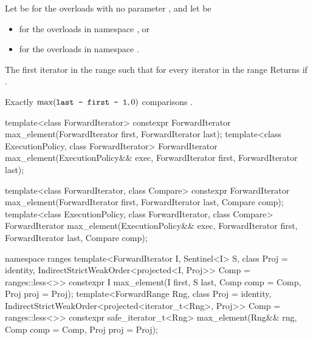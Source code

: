 \begin{itemdescr}
\begin{addedblock}
\pnum
Let  be  for the overloads with no parameter
, and let  be
\begin{itemize}
\item {} for the overloads in namespace , or
\item {} for
  the overloads in namespace .
\end{itemize}
\end{addedblock}

\pnum
\returns
The first iterator
in the range
such that for every iterator
in the range
Returns
if
.

\pnum
\complexity
Exactly
$\max(\texttt{last - first - 1}, 0)$
 comparisons
.
\end{itemdescr}


%
\begin{itemdecl}
template<class ForwardIterator>
  constexpr ForwardIterator max_element(ForwardIterator first, ForwardIterator last);
template<class ExecutionPolicy, class ForwardIterator>
  ForwardIterator max_element(ExecutionPolicy&& exec,
                              ForwardIterator first, ForwardIterator last);

template<class ForwardIterator, class Compare>
  constexpr ForwardIterator max_element(ForwardIterator first, ForwardIterator last,
                                        Compare comp);
template<class ExecutionPolicy, class ForwardIterator, class Compare>
  ForwardIterator max_element(ExecutionPolicy&& exec,
                              ForwardIterator first, ForwardIterator last,
                              Compare comp);
\end{itemdecl}
\begin{addedblock}
\begin{itemdecl}
namespace ranges {
  template<ForwardIterator I, Sentinel<I> S, class Proj = identity,
      IndirectStrictWeakOrder<projected<I, Proj>> Comp = ranges::less<>>
    constexpr I max_element(I first, S last, Comp comp = Comp{}, Proj proj = Proj{});
  template<ForwardRange Rng, class Proj = identity,
      IndirectStrictWeakOrder<projected<iterator_t<Rng>, Proj>> Comp = ranges::less<>>
    constexpr safe_iterator_t<Rng>
      max_element(Rng&& rng, Comp comp = Comp{}, Proj proj = Proj{});
}
\end{itemdecl}
\end{addedblock}

